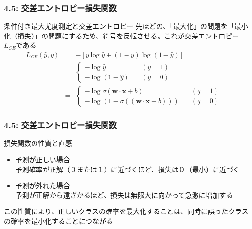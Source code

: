 \documentclass[unicode,11pt]{beamer} %
\begin{document}
\begin{frame}
    \frametitle{4.5: 交差エントロピー損失関数}
    \begin{alertblock}{条件付き最大尤度測定と交差エントロピー}
        先ほどの、「最大化」の問題を「最小化（損失）」の問題にするため、符号を反転させる。これが交差エントロピー$L_{CE}$である
        \begin{eqnarray*}
            L_{CE}(\hat{y}, y) &=& -[y \log \hat{y} + (1 - y) \log (1 - \hat{y})] \\
                               &=&
                               \left\{
                                \begin{alignedat}{2}
                                    - \log \hat{y}         \quad &(y = 1)& \\
                                    - \log (1-\hat{y} )      \quad &(y = 0)&
                                \end{alignedat}
                              \right. \\
                               &=&
                               \left\{
                                \begin{alignedat}{2}
                                    - \log \sigma(\boldsymbol{w} \cdot \boldsymbol{x} + b)         \quad &(y = 1)& \\
                                    - \log (1 - \sigma((\boldsymbol{w} \cdot \boldsymbol{x} + b)))     \quad &(y = 0)&
                                \end{alignedat}
                              \right.
        \end{eqnarray*}
    \end{alertblock}

\end{frame}

\begin{frame}
    \frametitle{4.5: 交差エントロピー損失関数}
    \begin{alertblock}{損失関数の性質と直感}
        \begin{itemize}
            \item 予測が正しい場合\\予測確率が正解（０または１）に近づくほど、損失は０（最小）に近づく
            \item 予測が外れた場合\\予測が正解から遠ざかるほど、損失は無限大に向かって急激に増加する
        \end{itemize}
        この性質により、正しいクラスの確率を最大化することは、同時に誤ったクラスの確率を最小化することにつながる
    \end{alertblock}
\end{frame}
\end{document}
